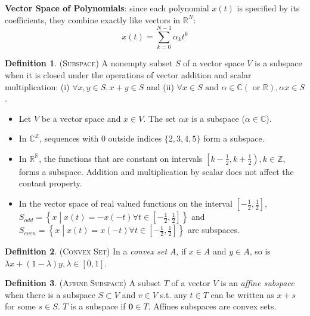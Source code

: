 \documentclass[9pt, twocolumn]{extarticle}
\theoremstyle{definition}
\newtheorem{definition}{Definition}
\begin{document}
\noindent \textbf{Vector Space of Polynomials}: since each polynomial $x(t)$ is specified by its coefficients, they combine exactly like vectors in $ \mathds{R}^N $:\vspace{-0.3cm}
\[x(t) = \sum_{k=0}^{N-1}\alpha_kt^k\]

\begin{definition}{(\textsc{Subspace})}
  A nonempty subset $S$ of a vector space $V$ is a subspace when it is closed under the operations of vector addition and scalar multiplication: (i) $\forall x,y \in S, x+y\in S$ and (ii) $\forall x \in S \text{ and } \alpha\in \mathds{C}(\text{ or }\mathds{R}), \alpha x \in S$.
\end{definition}

\begin{itemize}
  \item Let $V$ be a vector space and $x\in V$. The set $\alpha x$ is a subspace ($ \alpha\in\mathds{C} $).
  \item In $ \mathds{C}^\mathds{Z} $, sequences with 0 outside indices $ \{2,3,4,5\} $ form a subspace.
  \item In $ \mathds{R}^\mathds{R} $, the functions that are constant on intervals $ \left[k-\frac{1}{2},k+\frac{1}{2}\right), k\in\mathds{Z} $, forms a subspace. Addition and multiplication by scalar does not affect the contant property.
  \item In the vector space of real valued functions on the interval $ \left[-\frac{1}{2},\frac{1}{2}\right] $,\\ $S_{odd}=\left\{x\middle|x(t)=-x(-t)\forall t\in\left[-\frac{1}{2},\frac{1}{2}\right]\right\}$ and\\ $S_{even}=\left\{x\middle|x(t)=x(-t)\forall t\in\left[-\frac{1}{2},\frac{1}{2}\right]\right\}$ are subspaces.
\end{itemize}

\begin{definition}{(\textsc{Convex Set})}
  In a \emph{convex set} $A$, if $x\in A$ and $y\in A$, so is $\lambda x + (1-\lambda)y, \lambda \in [0,1]$.
\end{definition}

\begin{definition}{(\textsc{Affine Subspace})}
  A subset $T$ of a vector $V$ is an \emph{affine subspace} when there is a subspace $S\subset V$ and $v\in V$ s.t. any $ t\in T $ can be written as $x+s$ for some $s\in S$. $T$ is a subspace if $\textbf{0}\in T$. Affines subspaces are convex sets.
\end{definition}
\end{document}
